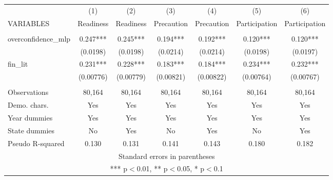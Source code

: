 \documentclass[]{article}
\begin{document}
\begin{tabular}{lcccccc} \hline
 & (1) & (2) & (3) & (4) & (5) & (6) \\
VARIABLES & Readiness & Readiness & Precaution & Precaution & Participation & Participation \\ \hline
 &  &  &  &  &  &  \\
overconfidence\_mlp & 0.247*** & 0.245*** & 0.194*** & 0.192*** & 0.120*** & 0.120*** \\
 & (0.0198) & (0.0198) & (0.0214) & (0.0214) & (0.0198) & (0.0197) \\
fin\_lit & 0.231*** & 0.228*** & 0.183*** & 0.184*** & 0.234*** & 0.232*** \\
 & (0.00776) & (0.00779) & (0.00821) & (0.00822) & (0.00764) & (0.00767) \\
 &  &  &  &  &  &  \\
Observations & 80,164 & 80,164 & 80,164 & 80,164 & 80,164 & 80,164 \\
Demo. chars. & Yes & Yes & Yes & Yes & Yes & Yes \\
Year dummies & Yes & Yes & Yes & Yes & Yes & Yes \\
State dummies & No & Yes & No & Yes & No & Yes \\
 Pseudo R-squared & 0.130 & 0.131 & 0.141 & 0.143 & 0.180 & 0.182 \\ \hline
\multicolumn{7}{c}{ Standard errors in parentheses} \\
\multicolumn{7}{c}{ *** p$<$0.01, ** p$<$0.05, * p$<$0.1} \\
\end{tabular}
\end{document}
